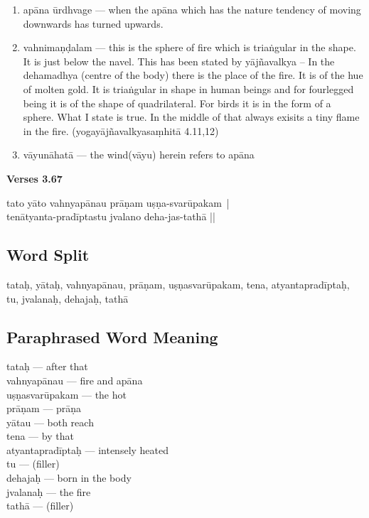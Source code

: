 \begin{enumerate}
\item apāna ūrdhvage --- when the apāna which has the nature tendency of moving downwards has turned upwards.
\item vahnimaṇḍalam --- this is the sphere of fire which is triaṅgular in the shape. It is just below the navel. This has been stated by yājñavalkya – In the dehamadhya (centre of the body) there is the place of the fire. It is of the hue of molten gold. It is triaṅgular in shape in human beings and for fourlegged being it is of the shape of quadrilateral. For birds it is in the form of a sphere. What I state is true. In the middle of that always exisits a tiny flame in the fire.   (yogayājñavalkyasaṃhitā 4.11,12)   
\item vāyunāhatā --- the wind(vāyu) herein refers to  apāna
\end{enumerate}


\noindent \textbf{Verses 3.67}

\begin{shloka}
tato yāto vahnyapānau prāṇam uṣṇa-svarūpakam |\\
tenātyanta-pradīptastu jvalano deha-jas-tathā ||
\end{shloka}

\subsection*{Word Split}

tataḥ, yātaḥ,  vahnyapānau, prāṇam, uṣṇasvarūpakam, tena, atyantapradīptaḥ, tu, jvalanaḥ, dehajaḥ, tathā

\subsection*{Paraphrased Word Meaning}

\begin{multicols}{2}
tataḥ --- after that \\
vahnyapānau --- fire and apāna\\
uṣṇasvarūpakam --- the hot \\
prāṇam --- prāṇa\\
yātau --- both reach \\
tena --- by that \\
atyantapradīptaḥ --- intensely heated  \\
tu --- (filler)\\
dehajaḥ --- born in the body\\
jvalanaḥ --- the fire \\
tathā --- (filler)
\end{multicols}

